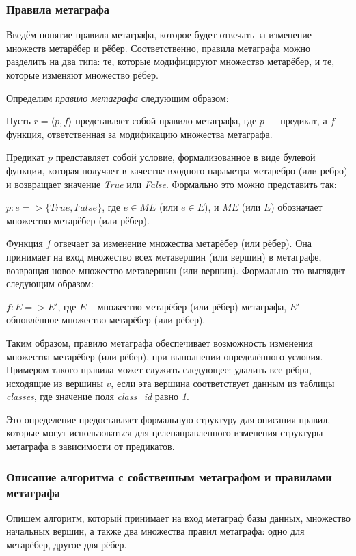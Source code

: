 \subsubsection{Правила метаграфа}
Введём понятие правила метаграфа, которое будет отвечать за изменение множеств метарёбер и рёбер. Соответственно, правила метаграфа можно разделить на два типа: те, которые модифицируют множество метарёбер, и те, которые изменяют множество рёбер.

Определим \textit{правило метаграфа} следующим образом:

Пусть $r = \langle p, f \rangle$ представляет собой правило метаграфа, где $p$ — предикат, а $f$ — функция, ответственная за модификацию множества метаграфа.

Предикат $p$ представляет собой условие, формализованное в виде булевой функции, которая получает в качестве входного параметра метаребро (или ребро) и возвращает значение \textit{True} или \textit{False}. Формально это можно представить так:

$p: e => \{True, False\}$, где $e \in ME$ (или $e \in E$), и $ME$ (или $E$) обозначает множество метарёбер (или рёбер).

Функция $f$ отвечает за изменение множества метарёбер (или рёбер). Она принимает на вход множество всех метавершин (или вершин) в метаграфе, возвращая новое множество метавершин (или вершин). Формально это выглядит следующим образом:

$f: E => E'$, где $E$ -- множество метарёбер (или рёбер) метаграфа, $E'$ -- обновлённое множество метарёбер (или рёбер).

Таким образом, правило метаграфа обеспечивает возможность изменения множества метарёбер (или рёбер), при выполнении определённого условия. Примером такого правила может служить следующее: удалить все рёбра, исходящие из вершины $v$, если эта вершина соответствует данным из таблицы \textit{classes}, где значение поля \textit{class\_id} равно \textit{1}.

Это определение предоставляет формальную структуру для описания правил, которые могут использоваться для целенаправленного изменения структуры метаграфа в зависимости от предикатов.

\subsubsection{Описание алгоритма с собственным метаграфом и правилами метаграфа}
Опишем алгоритм, который принимает на вход метаграф базы данных, множество начальных вершин, а также два множества правил метаграфа: одно для метарёбер, другое для рёбер.

